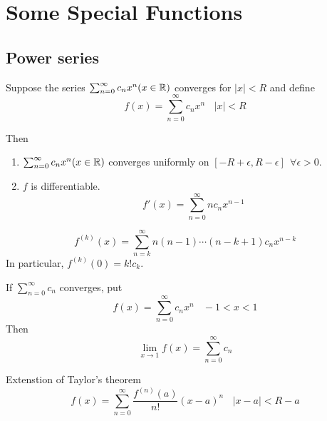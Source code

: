 \section{Some Special Functions}
    \subsection{Power series}
    \begin{theo}
        Suppose the series $\sum_{n=0}^\infty c_n x^n (x \in \mathbb{R})$ converges for $|x| < R$ and define
        \begin{equation}
            f(x) = \sum_{n=0}^\infty c_n x^n \ \ \ \ |x| < R
        \end{equation}
        
        Then
        \begin{enumerate}
            \item $\sum_{n=0}^\infty c_n x^n (x \in \mathbb{R})$ converges uniformly on $[-R+\epsilon, R-\epsilon] \ \ \forall \epsilon > 0$.

            \item $f$ is differentiable.
            \begin{equation}
                f'(x) = \sum_{n=0}^{\infty} n c_n x^{n-1}
            \end{equation}
        \end{enumerate}
    \end{theo}

    \begin{cor}
        \begin{equation}
            f^{(k)}(x) = \sum_{n=k}^{\infty} n(n-1)\cdots (n-k+1) c_n x^{n-k}
        \end{equation}
        In particular, $f^{(k)}(0) = k!c_k$.
    \end{cor}

    \begin{theo}
        If $\sum_{n=0}^{\infty} c_n$ converges, put
        \begin{equation}
            f(x) = \sum_{n=0}^\infty c_n x^n \ \ \ \ -1 < x < 1
        \end{equation}
        Then
        \begin{equation}
            \lim_{x \to 1} f(x) = \sum_{n=0}^{\infty} c_n
        \end{equation}
    \end{theo}

    \begin{theo}
        Extenstion of Taylor's theorem
        \begin{equation}
            f(x) = \sum_{n=0}^\infty \frac{f^{(n)}(a)}{n!} (x-a)^n \ \ \ \ |x-a| < R - a
        \end{equation}
    \end{theo}

